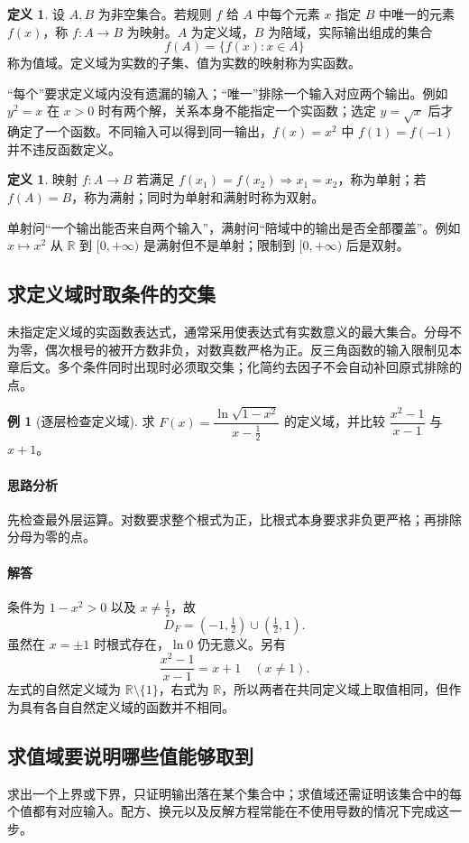 \documentclass[UTF8,fontset=fandol,12pt,oneside,openany]{ctexrep}
\newcommand{\R}{\mathbb R}
\theoremstyle{definition}
\newtheorem{definition}[theorem]{定义}
\newtheorem{example}{例}[chapter]
\begin{document}
\begin{definition}
设 $A,B$ 为非空集合。若规则 $f$ 给 $A$ 中每个元素 $x$ 指定 $B$ 中唯一的元素 $f(x)$，称 $f:A\to B$ 为映射。$A$ 为定义域，$B$ 为陪域，实际输出组成的集合
\[
 f(A)=\{f(x):x\in A\}
\]
称为值域。定义域为实数的子集、值为实数的映射称为实函数。
\end{definition}
“每个”要求定义域内没有遗漏的输入；“唯一”排除一个输入对应两个输出。例如 $y^2=x$ 在 $x>0$ 时有两个解，关系本身不能指定一个实函数；选定 $y=\sqrt{x}$ 后才确定了一个函数。不同输入可以得到同一输出，$f(x)=x^2$ 中 $f(1)=f(-1)$ 并不违反函数定义。

\begin{definition}
映射 $f:A\to B$ 若满足 $f(x_1)=f(x_2)\Rightarrow x_1=x_2$，称为单射；若 $f(A)=B$，称为满射；同时为单射和满射时称为双射。
\end{definition}
单射问“一个输出能否来自两个输入”，满射问“陪域中的输出是否全部覆盖”。例如 $x\mapsto x^2$ 从 $\R$ 到 $[0,+\infty)$ 是满射但不是单射；限制到 $[0,+\infty)$ 后是双射。

\subsection{求定义域时取条件的交集}
未指定定义域的实函数表达式，通常采用使表达式有实数意义的最大集合。分母不为零，偶次根号的被开方数非负，对数真数严格为正。反三角函数的输入限制见本章后文。多个条件同时出现时必须取交集；化简约去因子不会自动补回原式排除的点。

\begin{example}[逐层检查定义域]
求 $F(x)=\dfrac{\ln\sqrt{1-x^2}}{x-\tfrac12}$ 的定义域，并比较 $\dfrac{x^2-1}{x-1}$ 与 $x+1$。
\end{example}
\paragraph{思路分析} 先检查最外层运算。对数要求整个根式为正，比根式本身要求非负更严格；再排除分母为零的点。
\paragraph{解答} 条件为 $1-x^2>0$ 以及 $x\ne\tfrac12$，故
\[
 D_F=(-1,\tfrac12)\cup(\tfrac12,1).
\]
虽然在 $x=\pm1$ 时根式存在，$\ln0$ 仍无意义。另有
\[
 \frac{x^2-1}{x-1}=x+1\quad(x\ne1).
\]
左式的自然定义域为 $\R\setminus\{1\}$，右式为 $\R$，所以两者在共同定义域上取值相同，但作为具有各自自然定义域的函数并不相同。

\subsection{求值域要说明哪些值能够取到}
求出一个上界或下界，只证明输出落在某个集合中；求值域还需证明该集合中的每个值都有对应输入。配方、换元以及反解方程常能在不使用导数的情况下完成这一步。
\end{document}
